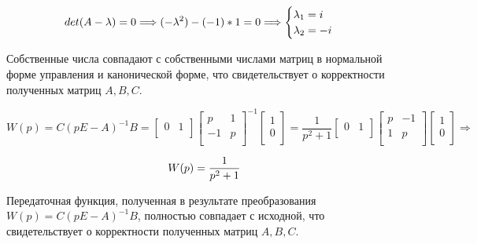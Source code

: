 \documentclass[14pt,a4paper,report]{report}
\begin{document}
\begin{equation*}
\text{$det(A-\lambda)=0$}
\Longrightarrow
\text{$ (-\lambda^2) - (-1) * 1=0$}
\Longrightarrow
\begin{cases}
	\text{$\lambda_1=i$} \\
	\text{$\lambda_2=-i$}
\end{cases}
\end{equation*}

Собственные числа совпадают с собственными числами матриц в нормальной форме управления и канонической форме, что свидетельствует о корректности полученных матриц  $A, B, C$.

\begin{equation*}
\text{$W(p)=C(pE-A)^{-1}B=
\begin{bmatrix}
0 & 1 \\
\end{bmatrix}
\begin{bmatrix}
p & 1 \\
-1 & p\\
\end{bmatrix}^{-1}
\begin{bmatrix}
1 \\
0 \\
\end{bmatrix}=
\frac{1}{p^2 + 1}
\begin{bmatrix}
0 & 1 \\
\end{bmatrix}
\begin{bmatrix}
p & -1 \\
1 & p \\
\end{bmatrix}
\begin{bmatrix}
1 \\
0 \\
\end{bmatrix}
$}
\Longrightarrow
\end{equation*}

\begin{equation*}
\text{$
W(p) = \frac{1}{p^2+1}
$}
\end{equation*}

Передаточная функция, полученная в результате преобразования $W(p)=C(pE-A)^{-1}B$, полностью совпадает с исходной, что свидетельствует о корректности полученных матриц  $A, B, C$. 

\clearpage

\end{document}
